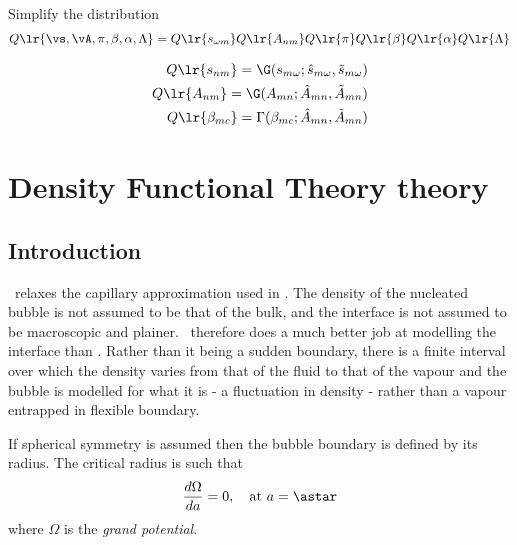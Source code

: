 {Simplify the distribution
\begin{align}
Q\lr{\vs, \vA, \pi, \beta, \alpha, \Lambda} = Q\lr{s_{\omega m}}Q\lr{A_{nm}}Q\lr{\pi}Q\lr{\beta}Q\lr{\alpha}Q\lr{\Lambda}
\end{align}

\begin{align}
  Q\lr{s_{nm}} = \G(s_{m \omega};\hat{s}_{m\omega}, \tilde{s}_{m\omega})\\
  Q\lr{A_{nm}} = \G(A_{mn};\hat{A}_{mn}, \tilde{A}_{mn})\\
  Q\lr{\beta_{mc}} = \Gamma(\beta_{mc};\hat{A}_{mn}, \tilde{A}_{mn})
\end{align}




\section{Density Functional Theory theory}\label{app:DFT}


\subsection{Introduction}

\Dft\ relaxes the capillary approximation used in \cnt.
The density of the nucleated bubble is not assumed to be that of the bulk,
and the interface is not assumed to be macroscopic and plainer\cite{Oxtoby1992, Oxtoby1998}.
\Dft\ therefore does a much better job at modelling the interface than \cnt.
Rather than it being a sudden boundary,
there is a finite interval over which the density varies from that of the fluid to that of the vapour
and the bubble is modelled for what it is -  a fluctuation in density - 
rather than a vapour entrapped in  flexible boundary.

If  spherical symmetry is assumed then 
the bubble boundary is defined by its radius.
The critical radius is such that\cite{Oxtoby1992,Oxtoby1998}
\begin{align}
  \frac{d \Omega}{d a} =0,\quad\text{at $a = \astar$} \label{eqn:DFT:astarR}
\end{align}
where $\Omega$ is the {\em grand potential}.


}
